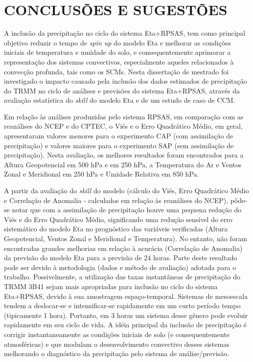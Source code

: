 \hypertarget{estilo:capitulo}{}
\chapter{CONCLUSÕES E SUGESTÕES}
\label{ss:cap5}

A inclusão da precipitação no ciclo do sistema Eta+RPSAS, tem como principal objetivo reduzir o tempo de \textit{spin up} do modelo Eta e melhorar as condições iniciais de temperatura e umidade do solo, e consequentemente aprimorar a representação dos sistemas convectivos, especialmente aqueles relacionados à convecção profunda, tais como os SCMs. Nesta dissertação de mestrado foi investigado o impacto causado pela inclusão dos dados estimados de precipitação do TRMM no ciclo de análises e previsões do sistema Eta+RPSAS, através da avaliação estatística do \textit{skill} do modelo Eta e de um estudo de caso de CCM.

Em relação às análises produzidas pelo sistema RPSAS, em comparação com as reanálises do NCEP e do CPTEC, o Viés e o Erro Quadrático Médio, em geral, apresentaram valores menores para o experimento CAP (com assimilação de precipitação) e valores maiores para o experimento SAP (sem assimilação de precipitação). Nesta avaliação, os melhores resultados foram encontrados para
a Altura Geopotencial em 500 hPa e em 250 hPa, a Temperatura do Ar e Ventos Zonal e Meridional em 250 hPa e Umidade Relativa em 850 hPa.

A partir da avaliação do \textit{skill} do modelo (cálculo do Viés, Erro Quadrático Médio e Correlação de Anomalia - calculados em relação às reanálises do NCEP), pôde-se notar que com a assimilação de precipitação houve uma pequena redução do Viés e do Erro Quadrático Médio, significando uma redução sensível do erro sistemático do modelo Eta no prognóstico das variáveis verificadas (Altura Geopotencial, Ventos Zonal e Meridional e Temperatura). No entanto, não foram encontradas grandes melhorias em relação à acurácia (Correlação de Anomalia) da previsão do modelo Eta para a previsão de 24 horas. Parte deste resultado pode ser devido à metodologia (dados e método de avaliação) adotada para o trabalho. Possivelmente, a utilização das taxas instantâneas de precipitação do TRMM 3B41 sejam mais apropriadas para inclusão no ciclo do sistema Eta+RPSAS, devido à sua amostragem espaço-temporal. Sistemas de mesoescala tendem a deslocar-se e intensificar-se rapidamente em um curto período tempo (tipicamente 1 hora). Portanto, em 3 horas um sistema desse gênero pode evoluir rapidamente em seu ciclo de vida. A idéia principal da inclusão de precipitação é corrigir instantaneamente as condições iniciais de solo (e consequentemente atmosféricas) e que modulam o desenvolvimento convectivo desses sistemas melhorando o diagnóstico da precipitação pelo sistema de análise/previsão.


